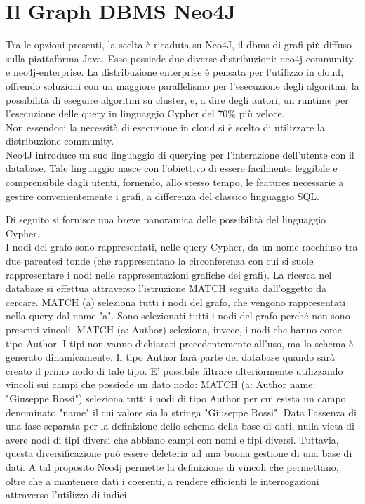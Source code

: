 \documentclass[a4paper,12pt]{article}
\let\oldsection\section
\renewcommand\section{\clearpage\oldsection}
\begin{document}
\section{Il Graph DBMS Neo4J}
Tra le opzioni presenti, la scelta è ricaduta su Neo4J, il dbms di grafi più diffuso sulla piattaforma Java. Esso possiede due diverse distribuzioni: neo4j-community e neo4j-enterprise. La distribuzione enterprise è pensata per l'utilizzo in cloud, offrendo soluzioni con un maggiore parallelismo per l'esecuzione degli algoritmi, la possibilità di eseguire algoritmi su cluster, e, a dire degli autori, un runtime per l'esecuzione delle query in linguaggio Cypher del 70\% più veloce. \\
Non essendoci la necessità di esecuzione in cloud si è scelto di utilizzare la distribuzione community. \\
Neo4J introduce un suo linguaggio di querying per l'interazione dell'utente con il database. Tale linguaggio nasce con l'obiettivo di essere facilmente leggibile e comprensibile dagli utenti, fornendo, allo stesso tempo, le features necessarie a gestire convenientemente i grafi, a differenza del classico linguaggio SQL.
\par
Di seguito si fornisce una breve panoramica delle possibilità del linguaggio Cypher. \\
I nodi del grafo sono rappresentati, nelle query Cypher, da un nome racchiuso tra due parentesi tonde (che rappresentano la circonferenza con cui si suole rappresentare i nodi nelle rappresentazioni grafiche dei grafi). La ricerca nel database si effettua attraverso l'istruzione MATCH seguita dall'oggetto da cercare.
MATCH (a) seleziona tutti i nodi del grafo, che vengono rappresentati nella query dal nome "a". Sono selezionati tutti i nodi del grafo perché non sono presenti vincoli.
MATCH (a: Author) seleziona, invece, i nodi che hanno come tipo Author. I tipi non vanno dichiarati precedentemente all'uso, ma lo schema è generato dinamicamente. Il tipo Author farà parte del database quando sarà creato il primo nodo di tale tipo.
E' possibile filtrare ulteriormente utilizzando vincoli sui campi che possiede un dato nodo:
MATCH (a: Author {name: "Giuseppe Rossi"}) seleziona tutti i nodi di tipo Author per cui esista un campo denominato "name" il cui valore sia la stringa "Giuseppe Rossi". Data l'assenza di una fase separata per la definizione dello schema della base di dati, nulla vieta di avere nodi di tipi diversi che abbiano campi con nomi e tipi diversi. Tuttavia, questa diversificazione può essere deleteria ad una buona gestione di una base di dati. A tal proposito Neo4j permette la definizione di vincoli che permettano, oltre che a mantenere dati i coerenti, a rendere efficienti le interrogazioni attraverso l'utilizzo di indici.
\end{document}
